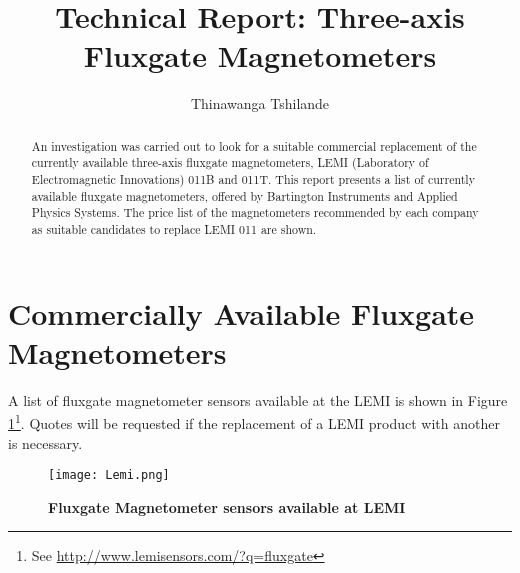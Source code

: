 \documentclass[a4paper,10pt]{report}
\title{Technical Report: Three-axis Fluxgate Magnetometers}
\author{Thinawanga Tshilande}
\begin{document}
\maketitle

\begin{abstract}
An investigation was carried out to look for a suitable commercial replacement of the
currently available three-axis fluxgate magnetometers, LEMI (Laboratory of
Electromagnetic Innovations) 011B and 011T. This report
presents a list of currently available fluxgate magnetometers, offered by Bartington 
Instruments and Applied Physics Systems. The price list of the magnetometers
recommended by each company as suitable candidates to replace LEMI 011 are shown. 
\end{abstract}
\section*{Commercially Available Fluxgate Magnetometers}
A list of fluxgate magnetometer sensors available at the LEMI is shown in Figure
\ref{Lemi}\footnote{See \url{http://www.lemisensors.com/?q=fluxgate}}. Quotes will be
requested if the replacement of a LEMI product with another is necessary.
\begin{figure}[!h]
\centering
\texttt{[image: Lemi.png]}
\caption{\textbf{Fluxgate Magnetometer sensors available at
LEMI}}
\label{Lemi}
\end{figure}
\end{document}
